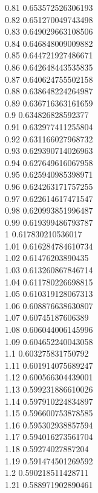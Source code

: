 {0.81	0.653572526306193\\
0.82	0.651270049743498\\
0.83	0.649029663108506\\
0.84	0.646848009009882\\
0.85	0.644721927486671\\
0.86	0.642648443535835\\
0.87	0.640624755502158\\
0.88	0.638648224264987\\
0.89	0.636716363161659\\
0.9	0.634826828592377\\
0.91	0.632977411255804\\
0.92	0.631166027968732\\
0.93	0.629390714026963\\
0.94	0.627649616067958\\
0.95	0.625940985398971\\
0.96	0.624263171757255\\
0.97	0.622614617471547\\
0.98	0.620993851996487\\
0.99	0.619399486793787\\
1	0.617830210536017\\
1.01	0.616284784610734\\
1.02	0.61476203890435\\
1.03	0.613260867846714\\
1.04	0.611780226698815\\
1.05	0.610319128067313\\
1.06	0.608876638630807\\
1.07	0.60745187606389\\
1.08	0.606044006145996\\
1.09	0.604652240043058\\
1.1	0.603275831750792\\
1.11	0.601914075689247\\
1.12	0.600566304439001\\
1.13	0.599231886610026\\
1.14	0.597910224834897\\
1.15	0.596600753878585\\
1.16	0.595302938857594\\
1.17	0.594016273561704\\
1.18	0.59274027887204\\
1.19	0.591474501269592\\
1.2	0.590218511428711\\
1.21	0.588971902890461\\
}
